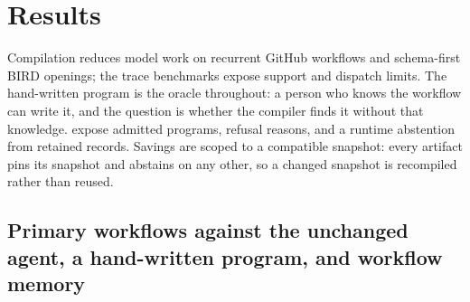 \section{Results}
\label{sec:results}

Compilation reduces model work on recurrent GitHub workflows and schema-first
BIRD openings; the trace benchmarks expose support and dispatch limits.
The hand-written program is the oracle throughout: a person who knows the
workflow can write it, and the question is whether the compiler finds it without
that knowledge.  expose admitted
programs, refusal reasons, and a runtime abstention from retained records. Savings are scoped to a
compatible snapshot: every artifact pins its snapshot and abstains on any other,
so a changed snapshot is recompiled rather than reused.



\subsection{Primary workflows against the unchanged agent, a hand-written program, and workflow memory}
\label{sec:res-primary}

\begin{table}[t]
  \centering
  \caption{Primary live-provider results ($n=30$ held-out records per family).
  ``Interfaces'' counts provider-visible tool interfaces. All conditions share
  records, model, and grader; \emph{Manual} is hand-written with full workflow
  knowledge (\cref{tab:manual-resources}, \cref{app:stats}).}
  \label{tab:primary}
  \footnotesize
  \setlength{\tabcolsep}{3.5pt}
  
\end{table}

\begin{table}[t]
  \centering
  \caption{Adapted offline Agent Workflow Memory (AWM) comparison on 1{,}344
  fresh primary records and two models. $100U$ is the simultaneous one-sided
  bound on \method's accuracy loss against AWM in points (six comparisons,
  Bonferroni); $^{\dagger}$ exceeds the registered five-point margin. USD/1k
  is estimated deployment cost per 1{,}000 attempted episodes, excluding
  induction (\cref{app:generalization-gate}).}
  \label{tab:awm}
  \footnotesize
  \setlength{\tabcolsep}{3.5pt}
  
\end{table}

